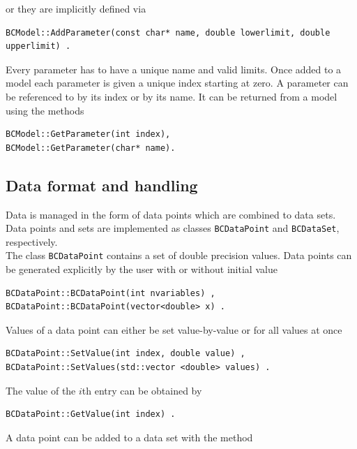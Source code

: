 \documentclass[11pt, a4paper]{article}
\begin{document}
\noindent 
or they are implicitly defined via 
%
\begin{verbatim}
BCModel::AddParameter(const char* name, double lowerlimit, double upperlimit) . 
\end{verbatim}

\noindent 
Every parameter has to have a unique name and valid limits. Once added
to a model each parameter is given a unique index starting at zero. A
parameter can be referenced to by its index or by its name. It can be
returned from a model using the methods
% 
\begin{verbatim} 
BCModel::GetParameter(int index), 
BCModel::GetParameter(char* name). 
\end{verbatim}  


\subsection{Data format and handling} 
\label{subsection:data} 

Data is managed in the form of data points which are combined to data
sets. Data points and sets are implemented as classes
\verb|BCDataPoint| and \verb|BCDataSet|, respectively. \\ 

\noindent 
The class \verb|BCDataPoint| contains a set of double precision
values. Data points can be generated explicitly by the user with or
without initial value
%
\begin{verbatim} 
BCDataPoint::BCDataPoint(int nvariables) ,
BCDataPoint::BCDataPoint(vector<double> x) .  
\end{verbatim} 

\noindent 
Values of a data point can either be set value-by-value or for all
values at once
%
\begin{verbatim} 
BCDataPoint::SetValue(int index, double value) , 
BCDataPoint::SetValues(std::vector <double> values) . 
\end{verbatim} 

\noindent 
The value of the $i$th entry can be obtained by 
%
\begin{verbatim}
BCDataPoint::GetValue(int index) . 
\end{verbatim} 

\noindent 
A data point can be added to a data set with the method
\end{document}
